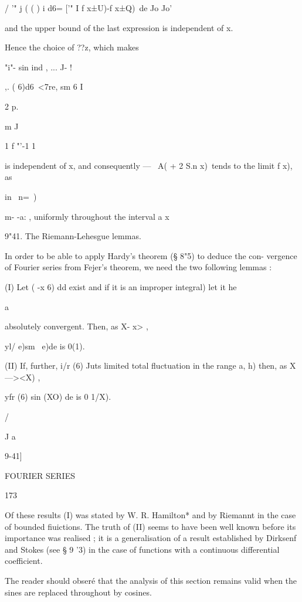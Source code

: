 / '" j ( ( ) i d6= ['" I f x±U)-f x±Q)\ de Jo Jo'



and the upper bound of the last expression is independent of x.

Hence the choice of ??z, which makes

"i"- sin ind , ... J- !

  ,. ( 6)d6\ <7re, sm 6 I



2 p.

m J



1 f "'-1 1

is independent of x, and consequently — \ A( + 2 S.n x)\ tends to the
limit f x), as

in \ n=\ )

m- -a: , uniformly throughout the interval a x%

9"41. The Riemann-Lehesgue lemmas.

In order to be able to apply Hardy's theorem (§ 8"5) to deduce the
con- vergence of Fourier series from Fejer's theorem, we need the two
following lemmas :

(I) Let ( -x 6) dd exist and if it is an improper integral) let it he

  a

absolutely convergent. Then, as X- x> ,

yl/ e)sm \ e)de is 0(1).



(II) If, further, i/r (6) Juts limited total fluctuation in the range
a, h) then, as X—><X) ,

yfr (6) sin (XO) de is 0 1/X).



/

J a



9-41]



FOURIER SERIES



173



Of these results (I) was stated by W. R. Hamilton* and by Riemannt in
the case of bounded fiuictions. The truth of (II) seems to have been
well known before its importance was realised ; it is a generalisation
of a result established by Dirksenf and Stokes (see § 9 '3) in the
case of functions with a continuous differential coefficient.

The reader should obser\'e that the analysis of this section remains
valid when the sines are replaced throughout by cosines.

